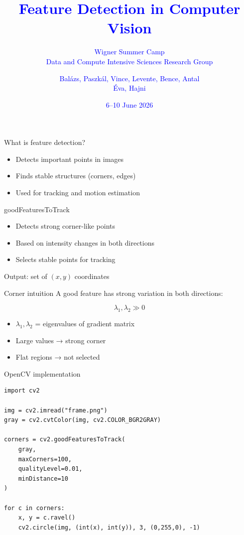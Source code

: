 \documentclass{beamer}
\title{\textcolor{blue}{Feature Detection in Computer Vision}}
\subtitle{\textcolor{blue}{Wigner Summer Camp \\ Data and Compute Intensive Sciences Research Group}}
\author{\textcolor{blue}{Balázs, Paszkál, Vince, Levente, Bence, Antal \\ Éva, Hajni}}
\date{\textcolor{blue}{6--10 June 2026}}
\begin{document}
\begin{frame}
    \titlepage
\end{frame}

\begin{frame}{What is feature detection?}
    \begin{itemize}
        \item Detects important points in images
        \item Finds stable structures (corners, edges)
        \item Used for tracking and motion estimation
    \end{itemize}
\end{frame}

\begin{frame}{goodFeaturesToTrack}
    \begin{itemize}
        \item Detects strong corner-like points
        \item Based on intensity changes in both directions
        \item Selects stable points for tracking
    \end{itemize}

    \vspace{0.3cm}

    Output: set of $(x, y)$ coordinates
\end{frame}

\begin{frame}{Corner intuition}
    A good feature has strong variation in both directions:

    \begin{equation}
        \lambda_1, \lambda_2 \gg 0
    \end{equation}

    \begin{itemize}
        \item $\lambda_1, \lambda_2$ = eigenvalues of gradient matrix
        \item Large values → strong corner
        \item Flat regions → not selected
    \end{itemize}
\end{frame}

\begin{frame}[fragile]{OpenCV implementation}
    \begin{lstlisting}
import cv2

img = cv2.imread("frame.png")
gray = cv2.cvtColor(img, cv2.COLOR_BGR2GRAY)

corners = cv2.goodFeaturesToTrack(
    gray,
    maxCorners=100,
    qualityLevel=0.01,
    minDistance=10
)

for c in corners:
    x, y = c.ravel()
    cv2.circle(img, (int(x), int(y)), 3, (0,255,0), -1)
\end{lstlisting}
\end{frame}
\end{document}
